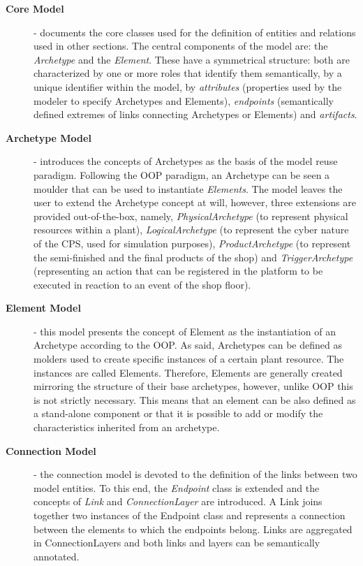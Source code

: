 \begin{description}
	\item[\textbf{Core Model}] - documents the core classes used for the definition of  entities and relations used in other sections. The central components of the model are: the \textit{Archetype} and the \textit{Element}. These have a symmetrical structure: both are characterized by one or more roles that identify them semantically, by a unique identifier within the model, by \textit{attributes} (properties used by the modeler to specify Archetypes and Elements), \textit{endpoints} (semantically defined extremes of links connecting Archetypes or Elements) and \textit{artifacts}. 
    \item [\textbf{Archetype Model}] - introduces the concepts of Archetypes as the basis of the model reuse paradigm. Following the OOP paradigm, an Archetype can be seen a moulder that can be used to instantiate \textit{Elements}. The model leaves the user to extend the Archetype concept at will, however, three extensions are provided out-of-the-box, namely, \textit{PhysicalArchetype} (to represent physical resources within a plant), \textit{LogicalArchetype} (to represent the cyber nature of the CPS, used for simulation purposes), \textit{ProductArchetype} (to represent the semi-finished and the final products of the shop) and \textit{TriggerArchetype} (representing an action that can be registered in the platform to be executed in reaction to an event of the shop floor). 
	\item[\textbf{Element Model}] - this model presents the concept of Element as the instantiation of an Archetype according to the OOP.  As said, Archetypes can be defined  as molders used to create specific instances of a certain plant resource. The instances are called Elements. Therefore, Elements are generally created mirroring the structure of their base archetypes, however, unlike  OOP  this is  not  strictly  necessary.  This  means  that  an  element  can  be also defined  as  a  stand-alone  component  or  that  it  is  possible  to add or modify the characteristics inherited from an archetype. 
	\item[\textbf{Connection Model}] - the connection model is devoted to the definition of the links between two model entities.  
To this end, the \textit{Endpoint} class is extended and the concepts of \textit{Link} and \textit{ConnectionLayer} are introduced. 
A Link joins together two instances of the Endpoint class and represents a connection between the elements to which the endpoints belong. 
Links are aggregated in ConnectionLayers and both links and layers can be semantically annotated.


\end{description}
